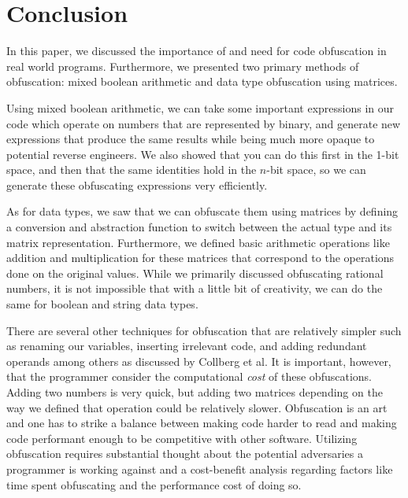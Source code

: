 \section{Conclusion}
In this paper, we discussed the importance of and need for code
obfuscation in real world programs. Furthermore, we presented two primary
methods of obfuscation: mixed boolean arithmetic and data type obfuscation
using matrices.

Using mixed boolean arithmetic, we can take some important expressions in our code
which operate on numbers that are represented by binary, and generate new expressions
that produce the same results while being much more opaque to potential reverse 
engineers. We also showed that you can do this first in the 1-bit space, and then
that the same identities hold in the $n$-bit space, so we can generate these
obfuscating expressions very efficiently.

As for data types, we saw that we can obfuscate them using matrices by defining
a conversion and abstraction function to switch between the actual type and its
matrix representation. Furthermore, we defined basic arithmetic operations like
addition and multiplication for these matrices that correspond to the
operations done on the original values. While we primarily discussed
obfuscating rational numbers, it is not impossible that with a little bit of
creativity, we can do the same for boolean and string data types.

There are several other techniques for obfuscation that are relatively simpler
such as renaming our variables, inserting irrelevant code, and adding redundant
operands among others as discussed by Collberg et al. It is important, however,
that the programmer consider the computational \textit{cost} of these
obfuscations. Adding two numbers is very quick, but adding two matrices
depending on the way we defined that operation could be relatively slower.
Obfuscation is an art and one has to strike a balance between making code
harder to read and making code performant enough to be competitive with other
software. Utilizing obfuscation requires substantial thought about the potential
adversaries a programmer is working against and a cost-benefit analysis regarding
factors like time spent obfuscating and the performance cost of doing so.
